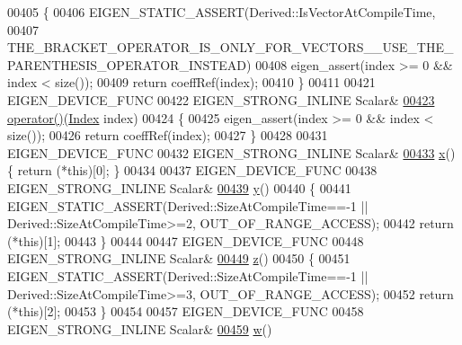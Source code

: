 \begin{DoxyCode}
00405     \{
00406       EIGEN\_STATIC\_ASSERT(Derived::IsVectorAtCompileTime,
00407                           THE\_BRACKET\_OPERATOR\_IS\_ONLY\_FOR\_VECTORS\_\_USE\_THE\_PARENTHESIS\_OPERATOR\_INSTEAD)
00408       eigen\_assert(index >= 0 && index < size());
00409       \textcolor{keywordflow}{return} coeffRef(index);
00410     \}
00411 
00421     EIGEN\_DEVICE\_FUNC
00422     EIGEN\_STRONG\_INLINE Scalar&
\hyperlink{group___core___module_a49d29adf378f99cd8ab048bff8a3f881}{00423}     \hyperlink{group___core___module_a49d29adf378f99cd8ab048bff8a3f881}{operator()}(\hyperlink{group___core___module_a554f30542cc2316add4b1ea0a492ff02}{Index} index)
00424     \{
00425       eigen\_assert(index >= 0 && index < size());
00426       \textcolor{keywordflow}{return} coeffRef(index);
00427     \}
00428 
00431     EIGEN\_DEVICE\_FUNC
00432     EIGEN\_STRONG\_INLINE Scalar&
\hyperlink{group___core___module_a2a9ca10b9ee750cefc5f914f215cba18}{00433}     \hyperlink{group___core___module_a2a9ca10b9ee750cefc5f914f215cba18}{x}() \{ \textcolor{keywordflow}{return} (*\textcolor{keyword}{this})[0]; \}
00434 
00437     EIGEN\_DEVICE\_FUNC
00438     EIGEN\_STRONG\_INLINE Scalar&
\hyperlink{group___core___module_ac04b8e2ab263c3901d72c5240ad017b5}{00439}     \hyperlink{group___core___module_ac04b8e2ab263c3901d72c5240ad017b5}{y}()
00440     \{
00441       EIGEN\_STATIC\_ASSERT(Derived::SizeAtCompileTime==-1 || Derived::SizeAtCompileTime>=2, 
      OUT\_OF\_RANGE\_ACCESS);
00442       \textcolor{keywordflow}{return} (*\textcolor{keyword}{this})[1];
00443     \}
00444 
00447     EIGEN\_DEVICE\_FUNC
00448     EIGEN\_STRONG\_INLINE Scalar&
\hyperlink{group___core___module_ad64b8fa3ee1cda9eb3df918eaf8b0396}{00449}     \hyperlink{group___core___module_ad64b8fa3ee1cda9eb3df918eaf8b0396}{z}()
00450     \{
00451       EIGEN\_STATIC\_ASSERT(Derived::SizeAtCompileTime==-1 || Derived::SizeAtCompileTime>=3, 
      OUT\_OF\_RANGE\_ACCESS);
00452       \textcolor{keywordflow}{return} (*\textcolor{keyword}{this})[2];
00453     \}
00454 
00457     EIGEN\_DEVICE\_FUNC
00458     EIGEN\_STRONG\_INLINE Scalar&
\hyperlink{group___core___module_a225a129a5f2d8863068bd5629a6144a6}{00459}     \hyperlink{group___core___module_a225a129a5f2d8863068bd5629a6144a6}{w}()

\end{DoxyCode}
